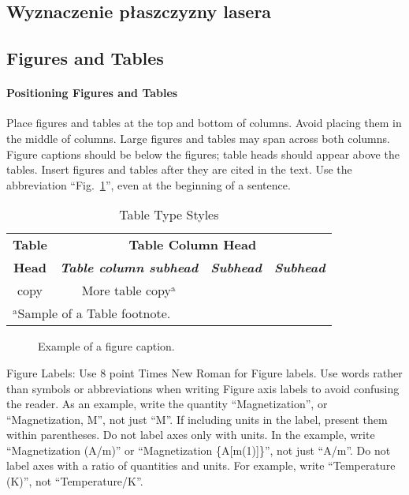 \documentclass[conference]{IEEEtran}
\begin{document}
\subsection{Wyznaczenie płaszczyzny lasera}



\subsection{Figures and Tables}
\paragraph{Positioning Figures and Tables} Place figures and tables at the top and 
bottom of columns. Avoid placing them in the middle of columns. Large 
figures and tables may span across both columns. Figure captions should be 
below the figures; table heads should appear above the tables. Insert 
figures and tables after they are cited in the text. Use the abbreviation 
``Fig.~\ref{fig}'', even at the beginning of a sentence.

\begin{table}[htbp]
\caption{Table Type Styles}
\begin{center}
\begin{tabular}{|c|c|c|c|}
\hline
\textbf{Table}&\multicolumn{3}{|c|}{\textbf{Table Column Head}} \\
\cline{2-4} 
\textbf{Head} & \textbf{\textit{Table column subhead}}& \textbf{\textit{Subhead}}& \textbf{\textit{Subhead}} \\
\hline
copy& More table copy$^{\mathrm{a}}$& &  \\
\hline
\multicolumn{4}{l}{$^{\mathrm{a}}$Sample of a Table footnote.}
\end{tabular}
\label{tab1}
\end{center}
\end{table}

\begin{figure}[htbp]
\caption{Example of a figure caption.}
\label{fig}
\end{figure}

Figure Labels: Use 8 point Times New Roman for Figure labels. Use words 
rather than symbols or abbreviations when writing Figure axis labels to 
avoid confusing the reader. As an example, write the quantity 
``Magnetization'', or ``Magnetization, M'', not just ``M''. If including 
units in the label, present them within parentheses. Do not label axes only 
with units. In the example, write ``Magnetization (A/m)'' or ``Magnetization 
\{A[m(1)]\}'', not just ``A/m''. Do not label axes with a ratio of 
quantities and units. For example, write ``Temperature (K)'', not 
``Temperature/K''.
\end{document}
